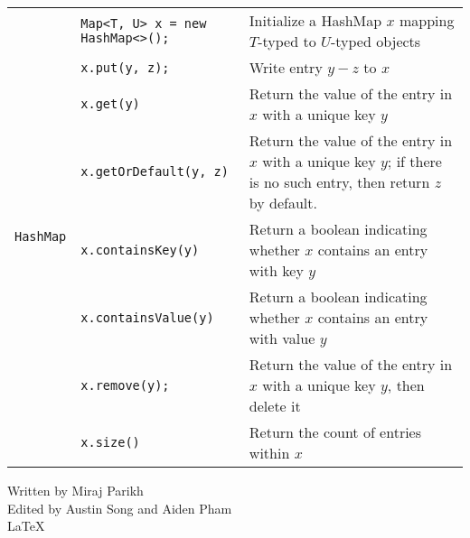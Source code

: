 \documentclass{article}
\begin{document}
\begin{center}
\begin{tabularx}{\textwidth}{llX}
\multirow{8}{*}[-0.5em]{\lstinline|HashMap|} & \lstinline|Map<T, U> x = new HashMap<>();| & Initialize a HashMap \(x\) mapping \(T\)-typed to \(U\)-typed objects\\
& \lstinline|x.put(y, z);| & Write entry \(y-z\) to \(x\)\\
& \lstinline|x.get(y)| & Return the value of the entry in \(x\) with a unique key \(y\)\\
& \lstinline|x.getOrDefault(y, z)| & Return the value of the entry in \(x\) with a unique key \(y\); if there is no such entry, then return \(z\) by default.\\
& \lstinline|x.containsKey(y)| & Return a boolean indicating whether \(x\) contains an entry with key \(y\)\\
& \lstinline|x.containsValue(y)| & Return a boolean indicating whether \(x\) contains an entry with value \(y\)\\
& \lstinline|x.remove(y);| & Return the value of the entry in \(x\) with a unique key \(y\), then delete it\\
& \lstinline|x.size()| & Return the count of entries within \(x\)
\\\bottomrule\end{tabularx}\end{center}






\vfill\raggedleft
Written by Miraj Parikh\\
Edited by Austin Song and Aiden Pham\\
\oldpilcrowfive\LaTeX
\end{document}
